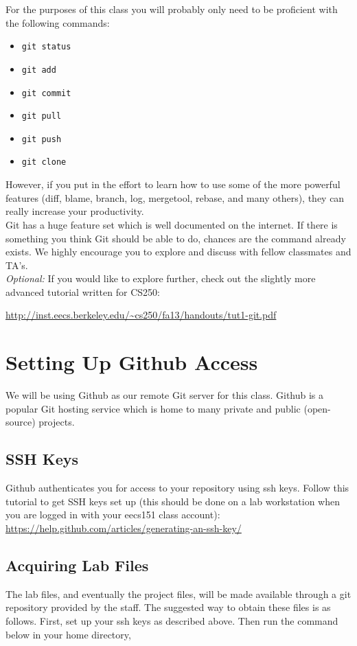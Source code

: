 \documentclass[11pt]{article}
\begin{document}
For the purposes of this class you will probably only need to be proficient with the following commands:
\begin{itemize}
\item {\tt git status}
\item {\tt git add}
\item {\tt git commit}
\item {\tt git pull}
\item {\tt git push}
\item {\tt git clone}
\end{itemize}
However, if you put in the effort to learn how to use some of the more powerful features (diff, blame, branch, log, mergetool, rebase, and many others), they can really increase your productivity.\\

Git has a huge feature set which is well documented on the internet. If there is something you think Git should be able to do, chances are the command already exists. We highly encourage you to explore and discuss with fellow classmates and TA's.\\

\textit{Optional:} If you would like to explore further, check out the slightly more advanced tutorial written for CS250:

\url{http://inst.eecs.berkeley.edu/~cs250/fa13/handouts/tut1-git.pdf}

\section{Setting Up Github Access}
We will be using Github as our remote Git server for this class. Github is a popular Git hosting service which is home to many private and public (open-source) projects.

\subsection{SSH Keys}
Github authenticates you for access to your repository using ssh keys. Follow this tutorial to get SSH keys set up (this should be done on a lab workstation when you are logged in with your eecs151 class account):\\

\url{https://help.github.com/articles/generating-an-ssh-key/}

\subsection{Acquiring Lab Files}
The lab files, and eventually the project files, will be made available through a git repository provided by the staff. The suggested way to obtain these files is as follows. First, set up your ssh keys as described above. Then run the command below in your home directory,
\end{document}
